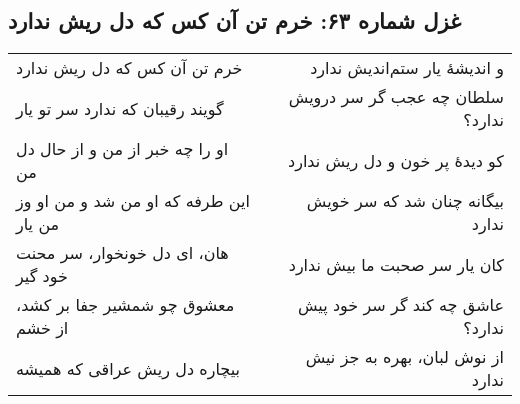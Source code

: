 \begin{center}
\section*{غزل شماره ۶۳: خرم تن آن کس که دل ریش ندارد}
\label{sec:063}
\begin{longtable}{l p{0.5cm} r}
خرم تن آن کس که دل ریش ندارد
&&
و اندیشهٔ یار ستم‌اندیش ندارد
\\
گویند رقیبان که ندارد سر تو یار
&&
سلطان چه عجب گر سر درویش ندارد؟
\\
او را چه خبر از من و از حال دل من
&&
کو دیدهٔ پر خون و دل ریش ندارد
\\
این طرفه که او من شد و من او وز من یار
&&
بیگانه چنان شد که سر خویش ندارد
\\
هان، ای دل خونخوار، سر محنت خود گیر
&&
کان یار سر صحبت ما بیش ندارد
\\
معشوق چو شمشیر جفا بر کشد، از خشم
&&
عاشق چه کند گر سر خود پیش ندارد؟
\\
بیچاره دل ریش عراقی که همیشه
&&
از نوش لبان، بهره به جز نیش ندارد
\\
\end{longtable}
\end{center}
